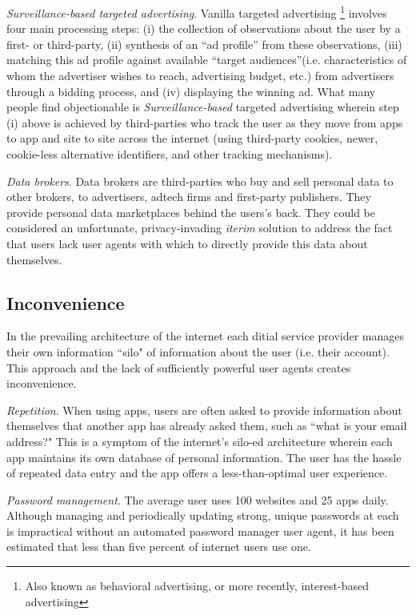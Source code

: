 \documentclass[11pt, oneside]{article}   	%
\begin{document}
\emph{Surveillance-based targeted advertising}. Vanilla targeted advertising \footnote{Also known as behavioral advertising, or more recently, interest-based advertising} involves four main processing steps: (i) the collection of observations about the user by a first- or third-party, (ii) synthesis of an ``ad profile” from these observations, (iii) matching this ad profile against available ``target audiences”(i.e. characteristics of whom the advertiser wishes to reach, advertising budget, etc.) from advertisers through a bidding process, and (iv) displaying the winning ad. What many people find objectionable is \emph{Surveillance-based} targeted advertising wherein step (i) above is achieved by third-parties who track the user as they move from apps to app and site to site across the internet (using third-party cookies, newer, cookie-less alternative identifiers, and other tracking mechanisms). 

\emph{Data brokers}. Data brokers are third-parties who buy and sell personal data to other brokers, to advertisers, adtech firms and first-party publishers. They provide  personal data marketplaces behind the users's back. They could be considered an unfortunate, privacy-invading \emph{iterim} solution to address the fact that users lack user agents with which to directly provide this data about themselves. 


\subsection{Inconvenience}
In the prevailing architecture of the internet each ditial service provider manages their own information ``silo" of information about the user (i.e. their account). This approach and the lack of sufficiently powerful user agents creates inconvenience.

\emph{Repetition}. When using apps, users are often asked to provide information about themselves that another app has already asked them, such as ``what is your email address?" This is a symptom of the internet's silo-ed architecture wherein each app maintains its own database of personal information. The user has the hassle of repeated data entry and the app offers a less-than-optimal user experience.

\emph{Password management}. The average user uses 100 websites and 25 apps daily. Although managing and periodically updating strong, unique passwords at each is  impractical without an automated password manager user agent, it has been estimated that less than five percent of internet users use one. 
\end{document}
